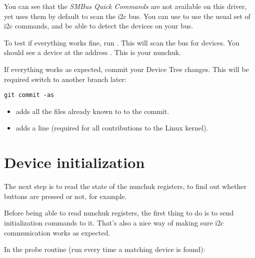 You can see that the {\em SMBus Quick Commands} are not available on
this driver, yet  uses them by default to scan the i2c
bus. You can use  to use the usual set of i2c
commands, and be able to detect the devices on your bus.

To test if everything works fine, run . This will
scan the  bus for devices. You should see a device at the
address . This is your nunchuk.

If everything works as expected, commit your Device Tree changes. This
will be required switch to another branch later:

\begin{verbatim}
git commit -as
\end{verbatim}

\begin{itemize}
\item {} adds all the files already known to
       to the commit.
\item {} adds a  line (required
      for all contributions to the Linux kernel).
\end{itemize}

\section{Device initialization}

The next step is to read the state of the nunchuk registers, to find out
whether buttons are pressed or not, for example.

Before being able to read nunchuk registers, the first thing to do is 
to send initialization commands to it. That's also a nice way of making
sure i2c communication works as expected.

In the probe routine (run every time a matching device is found):

